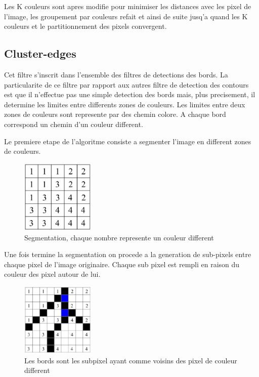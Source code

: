 \documentclass[twoside,openright,a4paper,11pt,french]{article}
\begin{document}
Les K couleurs sont apres modifie pour minimiser les distances avec
les pixel de l'image, les groupement par couleurs refait et ainsi de
suite jusq'a quand les K couleurs et le partitionnement des pixels
convergent. 

\subsection{Cluster-edges}
Cet filtre s'inscrit dans l'ensemble des filtres de detections des
bords. La particularite de ce filtre par rapport aux autres filtre de
detection des contours est que il n'effectue pas une simple detection
des bords mais, plus precisement, il determine les limites entre
differents zones de couleurs. 
Les limites entre deux zones de couleurs sont represente par des
chemin colore. A chaque bord correspond un chemin d'un couleur
different.

Le premiere etape de l'algoritme consiste a segmenter l'image en
different zones de couleurs.

\begin{figure}[h]
\centering
\includegraphics[width=3.5cm]{./pics/cluster-edges1.eps}
\caption{Segmentation, chaque nombre represente un couleur different}
\label{fig:routcidr}
\end{figure}

Une fois termine la segmentation on procede a la generation de
sub-pixels entre chaque pixel de l'image originaire. Chaque sub pixel
est rempli en raison du couleur des pixel autour de lui.

\begin{figure}[h]
\centering
\includegraphics[width=3.5cm]{./pics/cluster-edges2.eps}
\caption{Les bords sont les subpixel ayant comme voisins des pixel de
couleur different}
\label{fig:routcidr}
\end{figure}
\end{document}
